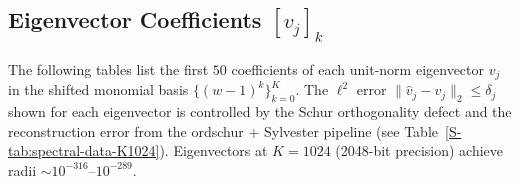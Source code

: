 
\subsection*{Eigenvector Coefficients $[v_j]_k$}

The following tables list the first $50$ coefficients of each unit-norm
eigenvector $v_j$ in the shifted monomial basis $\{(w-1)^k\}_{k=0}^{K}$.
The $\ell^2$ error $\|\hat{v}_j - v_j\|_2 \leq \delta_j$ shown for each
eigenvector is controlled by the Schur orthogonality defect and the
reconstruction error from the ordschur + Sylvester pipeline
(see Table~\ref{S-tab:spectral-data-K1024}).
Eigenvectors at $K = 1024$ (2048-bit precision) achieve radii $\sim 10^{-316}$--$10^{-289}$.

